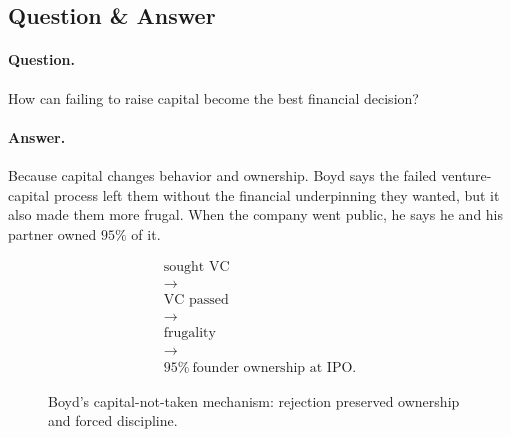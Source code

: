 \documentclass[11pt,oneside]{book}
\begin{document}
\subsection{Question \& Answer}

\paragraph{Question.}
How can failing to raise capital become the best financial decision?

\paragraph{Answer.}
Because capital changes behavior and ownership. Boyd says the failed venture-capital process left them without the financial underpinning they wanted, but it also made them more frugal. When the company went public, he says he and his partner owned \(95\%\) of it.

\begin{equation}
\begin{gathered}
\text{sought VC}\\
\longrightarrow\\
\text{VC passed}\\
\longrightarrow\\
\text{frugality}\\
\longrightarrow\\
95\%\ \text{founder ownership at IPO}.
\end{gathered}
\end{equation}

\begin{figure}
\centering
{}
\caption{Boyd's capital-not-taken mechanism: rejection preserved ownership and forced discipline.}
\end{figure}
\end{document}
